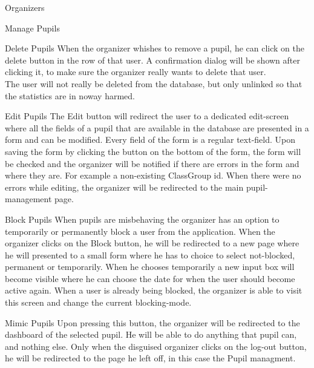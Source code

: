 \begin{section}{Organizers}
\begin{subsection}{Manage Pupils}
		\begin{subsubsection}{Delete Pupils}
			When the organizer whishes to remove a pupil, he can click on the delete
			button in the row of that user. A confirmation dialog will be shown after
			clicking it, to make sure the organizer really wants to delete that user. \\
			The user will not really be deleted from the database, but only unlinked so
			that the statistics are in noway harmed.
		\end{subsubsection}
		\begin{subsubsection}{Edit Pupils}
			\label{sec:organizer_edit_pupils}
			The Edit button will redirect the user to a dedicated edit-screen where all
			the fields of a pupil that are available in the database are presented in a
			form and can be modified. Every field of the form is a regular text-field.
			Upon saving the form by clicking the button on the bottom of the form, the
			form will be checked and the organizer will be notified if there are errors
			in the form and where they are. For example a non-existing ClassGroup id.
			When there were no errors while editing, the organizer will be redirected to
			the main pupil-management page.
		\end{subsubsection}
		\begin{subsubsection}{Block Pupils}
			When pupils are misbehaving the organizer has an option to temporarily or
			permanently block a user from the application. When the organizer clicks on
			the Block button, he will be redirected to a new page where he will presented
			to a small form where he has to choice to select not-blocked, permanent or
			temporarily. When he chooses temporarily a new input box will become visible
			where he can choose the date for when the user should become active again.
			When a user is already being blocked,
			the organizer is able to visit this screen and change the current
			blocking-mode.
		\end{subsubsection}
		\begin{subsubsection}{Mimic Pupils}
			Upon pressing this button, the organizer will be redirected to the dashboard
			of the selected pupil. He will be able to do anything that pupil can, and
			nothing else. Only when the disguised organizer clicks on the log-out button,
			he will be redirected to the page he left off, in this case the Pupil
			managment.
		\end{subsubsection}
		
	\end{subsection}
	

\end{section}
